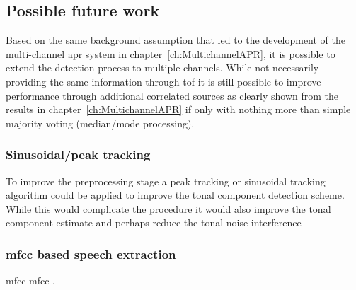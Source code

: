 \subsection{Possible future work}
Based on the same background assumption that led to the development of the multi-channel \DIFdelbegin {}\DIFdelend \DIFaddbegin \gls{apr} \DIFaddend system in chapter~\ref{ch:MultichannelAPR}, it is possible to extend the detection process to multiple channels. While not necessarily providing the same information through \DIFdelbegin {}\DIFdelend \DIFaddbegin \gls{tof} \DIFaddend it is still possible to improve performance through additional correlated sources as clearly shown from the results in chapter~\ref{ch:MultichannelAPR} if only with nothing more than simple majority voting (median/mode processing).

\subsubsection{Sinusoidal/peak tracking}
To improve the preprocessing stage a peak tracking or sinusoidal tracking algorithm could be applied to improve the tonal component detection scheme. While this would complicate the procedure it would also improve the tonal component estimate and perhaps reduce the tonal noise interference \cite{McAulay1986}\DIFaddbegin {}

\subsubsection{\gls{mfcc} based speech extraction}\label{corrections:mfcc2}
\gls{mfcc} \gls{mfcc} \DIFaddend .



